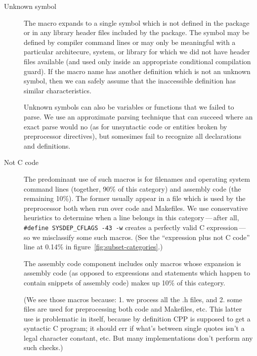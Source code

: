 \begin{description}
\item[Unknown symbol]
  The macro expands to a single symbol which is not defined in the package
  or in any library header files included by the package.  The symbol may
  be defined by compiler command lines or may only be meaningful with a
  particular architecure, system, or library for which we did not have
  header files available (and used only inside an appropriate conditional
  compilation guard).  If the macro name has another definition which is
  not an unknown symbol, then we can safely assume that the inaccessible
  definition has similar characteristics.

  Unknown symbols can also be variables or functions that we failed to
  parse.  We use an approximate parsing technique that can succeed where an
  exact parse would no (as for unsyntactic code or entities broken by
  preprocessor directives), but somesimes fail to recognize all
  declarations and definitions.


\item[Not C code]  The predominant use of such macros is for 
  filenames and operating system command lines (together, 90\% of this
  category) and assembly code (the remaining 10\%).  The former usually
  appear in a file which is used by the preprocessor both when run over
  code and Makefiles.  We use conservative heuristics to determine when a
  line belongs in this category\,---\,after all, {\tt \#define
  \verb|SYSDEP_CFLAGS| -43 -w} creates a perfectly valid C
  expression\,---\,so we misclassify some such macros.  (See the ``expression
  plus not C code'' line at 0.14\% in figure~\ref{fig:subset-categories}.)
  
  The assembly code component includes only macros whose expansion is
  assembly code (as opposed to expressions and statements which happen to
  contain snippets of assembly code) makes up 10\% of this category.
  
  (We see those macros because: 1. we process all the .h files, and 2. some
  files are used for preprocessing both code and Makefiles, etc.  This
  latter use is problematic in itself, because by definition CPP is
  supposed to get a syntactic C program; it should err if what's between
  single quotes isn't a legal character constant, etc.  But many
  implementations don't perform any such checks.)



\end{description}
